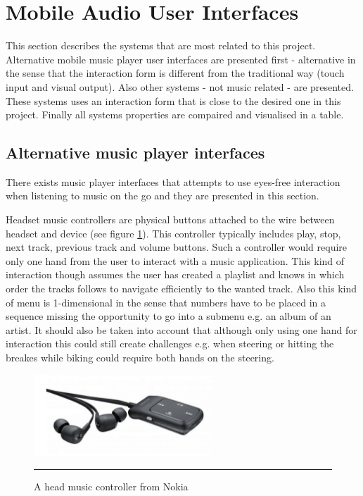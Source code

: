 

\section{Mobile Audio User Interfaces}
This section describes the systems that are most related to this project. Alternative mobile music player user interfaces are presented first - alternative in the sense that the interaction form is different from the traditional way (touch input and visual output). Also other systems - not music related - are presented. These systems uses an interaction form that is close to the desired one in this project. Finally all systems properties are compaired and visualised in a table.

\subsection{Alternative music player interfaces}
\label{sec:alternativemusicuis}
There exists music player interfaces that attempts to use eyes-free interaction when listening to music on the go and they are presented in this section.

Headset music controllers are physical buttons attached to the wire between headset and device (see figure \ref{fig:nokia}). This controller typically includes play, stop, next track, previous track and volume buttons. Such a controller would require only one hand from the user to interact with a music application. This kind of interaction though assumes the user has created a playlist and knows in which order the tracks follows to navigate efficiently to the wanted track. Also this kind of menu is 1-dimensional in the sense that numbers have to be placed in a sequence missing the opportunity to go into a submenu e.g. an album of an artist. It should also be taken into account that although only using one hand for interaction this could still create challenges e.g. when steering or hitting the breakes while biking could require both hands on the steering.

\begin{figure}[htbp]
	\centering
		\includegraphics[width=0.6\textwidth,height=\textheight,keepaspectratio]{./Figures/nokia-headset.png}
		\rule{35em}{0.5pt}
	\caption[Nokia music headset]{A head music controller from Nokia \cite{nokia_launch:_2011}}
	\label{fig:nokia}
\end{figure}

